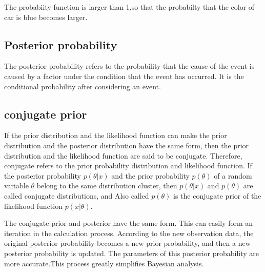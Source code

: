 The probabiity function is larger than 1,so that the probabilty that the color of car is blue becomes  larger.

\subsection{Posterior probability}
The posterior probability refers to the probability that the cause of the event is caused by a factor under the condition that the event has occurred. It is the conditional probability after considering an event.

\subsection{conjugate prior}
If the prior distribution and the likelihood function can make the prior distribution and the posterior distribution  have the same form, then the prior distribution and the likelihood function are said to be conjugate. Therefore, conjugate refers to the prior probability distribution and likelihood function. If the posterior probability $p(\theta|x)$ and the  prior probability $p(\theta)$ of a random variable $\theta$ belong to the same distribution cluster, then $p(\theta|x)$ and $p(\theta)$ are called conjugate distributions, and  Also called $p(\theta)$ is the conjugate prior of the likelihood function $p(x|\theta)$.

The conjugate prior and posterior have the same form. This can easily form an iteration in the calculation process. According to the new observation data, the original posterior probability becomes a new prior probability, and then a new posterior probability is updated. The parameters of this posterior probability are more accurate.This process greatly simplifies Bayesian analysis.

